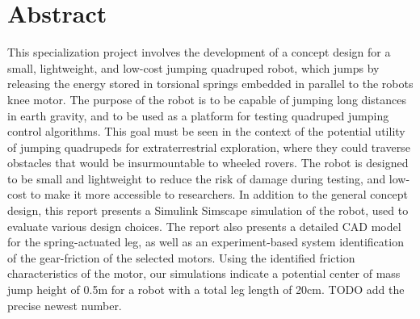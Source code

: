 \section*{Abstract}

This specialization project involves the development of a concept design for a small, lightweight, and low-cost jumping quadruped robot, which jumps by releasing the energy stored in torsional springs embedded in parallel to the robots knee motor. The purpose of the robot is to be capable of jumping long distances in earth gravity, and to be used as a platform for testing quadruped jumping control algorithms. This goal must be seen in the context of the potential utility of jumping quadrupeds for extraterrestrial exploration, where they could traverse obstacles that would be insurmountable to wheeled rovers. The robot is designed to be small and lightweight to reduce the risk of damage during testing, and low-cost to make it more accessible to researchers. In addition to the general concept design, this report presents a Simulink Simscape simulation of the robot, used to evaluate various design choices. The report also presents a detailed CAD model for the spring-actuated leg, as well as an experiment-based system identification of the gear-friction of the selected motors. Using the identified friction characteristics of the motor, our simulations indicate a potential center of mass jump height of 0.5m for a robot with a total leg length of 20cm. TODO add the precise newest number. 
